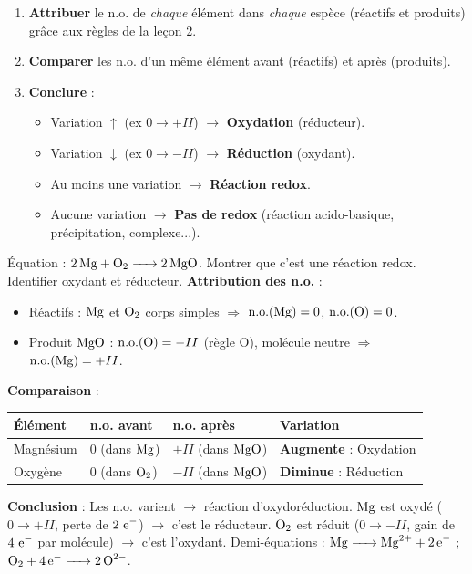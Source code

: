 \documentclass[11pt]{article}
\newcommand{\cle}[1]{{\popxbold\color{popdark}#1}}
\begin{document}
\begin{methode}
\begin{enumerate}
\item \textbf{Attribuer} le n.o. de \emph{chaque} élément dans \emph{chaque} espèce (réactifs et produits) grâce aux règles de la leçon 2.
\item \textbf{Comparer} les n.o. d'un même élément avant (réactifs) et après (produits).
\item \textbf{Conclure} :
      \begin{itemize}
      \item Variation $\uparrow$ (ex $0 \to +II$) $\rightarrow$ \textbf{Oxydation} (réducteur).
      \item Variation $\downarrow$ (ex $0 \to -II$) $\rightarrow$ \textbf{Réduction} (oxydant).
      \item Au moins une variation $\rightarrow$ \textbf{Réaction redox}.
      \item Aucune variation $\rightarrow$ \textbf{Pas de redox} (réaction acido-basique, précipitation, complexe...).
      \end{itemize}
\end{enumerate}
\end{methode}

\begin{exoresolu}
Équation : $\ce{2Mg + O2 -> 2MgO}$. Montrer que c'est une réaction redox. Identifier oxydant et réducteur.
\tcblower
\textbf{Attribution des n.o.} :
\begin{itemize}
\item Réactifs : $\ce{Mg}$ et $\ce{O2}$ corps simples $\Rightarrow$ $\mathrm{n.o.}(\ce{Mg})=0$, $\mathrm{n.o.}(\ce{O})=0$.
\item Produit $\ce{MgO}$ : $\mathrm{n.o.}(\ce{O})=-II$ (règle O), molécule neutre $\Rightarrow$ $\mathrm{n.o.}(\ce{Mg})=+II$.
\end{itemize}

\textbf{Comparaison} :
\begin{center}
\begin{tabularx}{\linewidth}{|l|X|X|X|}
\hline
\rowcolor{popblueL} Élément & n.o. avant & n.o. après & Variation \\
\hline
Magnésium & $0$ (dans $\ce{Mg}$) & $+II$ (dans $\ce{MgO}$) & \textbf{Augmente} : Oxydation \\
\hline
Oxygène & $0$ (dans $\ce{O2}$) & $-II$ (dans $\ce{MgO}$) & \textbf{Diminue} : Réduction \\
\hline
\end{tabularx}
\end{center}

\textbf{Conclusion} : Les n.o. varient $\rightarrow$ \cle{réaction d'oxydoréduction}.
$\ce{Mg}$ est oxydé ($0 \to +II$, perte de $2\ \ce{e-}$) $\rightarrow$ c'est le \cle{réducteur}.
$\ce{O2}$ est réduit ($0 \to -II$, gain de $4\ \ce{e-}$ par molécule) $\rightarrow$ c'est l'\cle{oxydant}.
Demi-équations : $\ce{Mg -> Mg^2+ + 2e-}$ ; $\ce{O2 + 4e- -> 2O^2-}$.
\end{exoresolu}
\end{document}
